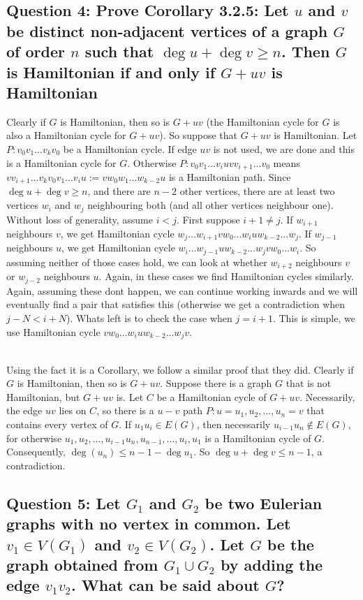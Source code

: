 \documentclass[letterpaper, 11pt]{article}
\newcommand{\1}{\mathds{1}}	%
\theoremstyle{definition}
\begin{document}
\subsection*{Question 4: Prove Corollary 3.2.5: Let $u$ and $v$ be distinct non-adjacent vertices of a graph $G$ of order $n$ such that $\deg u + \deg v \ge n$. Then $G$ is Hamiltonian if and only if $G + uv$ is Hamiltonian}
Clearly if $G$ is Hamiltonian, then so is $G + uv$ (the Hamiltonian cycle for $G$ is also a Hamiltonian cycle for $G + uv$). So suppose that $G + uv$ is Hamiltonian. Let $P: v_0v_1...v_kv_0$ be a Hamiltonian cycle. If edge $uv$ is not used, we are done and this is a Hamiltonian cycle for $G$. Otherwise $P : v_0v_1...v_{i}uvv_{i+1}...v_0$ means $vv_{i+1}...v_kv_0v_1...v_{i}u := vw_0w_1...w_{k-2}u$ is a Hamiltonian path. Since $\deg u + \deg v \ge n$, and there are $n-2$ other vertices, there are at least two vertices $w_i$ and $w_j$ neighbouring both (and all other vertices neighbour one). Without loss of generality, assume $i < j$. First suppose $i + 1 \ne j$. If $w_{i+1}$ neighbours $v$, we get Hamiltonian cycle $w_j ...w_{i+1}vw_0...w_iuw_{k-2}...w_j$. If $w_{j-1}$ neighbours $u$, we get Hamiltonian cycle $w_i ... w_{j-1}uw_{k-2}...w_j v w_0 ... w_i$. So assuming neither of those cases hold, we can look at whether $w_{i+2}$ neighbours $v$ or $w_{j-2}$ neighbours $u$. Again, in these cases we find Hamiltonian cycles similarly. Again, assuming these dont happen, we can continue working inwards and we will eventually find a pair that satisfies this (otherwise we get a contradiction when $j - N < i + N$). Whats left is to check the case when $j = i + 1$. This is simple, we use Hamiltonian cycle $vw_0...w_iuw_{k-2}...w_{j}v$.

 ~\\Using the fact it is a Corollary, we follow a similar proof that they did. 
Clearly if $G$ is Hamiltonian, then so is $G + uv$. Suppose there is a graph $G$ that is not Hamiltonian, but $G + uv$ is. Let $C$ be a Hamiltonian cycle of $G+uv$. Necessarily, the edge $uv$ lies on $C$, so there is a $u-v$ path $P:u=u_1,u_2,...,u_n=v$ that contains every vertex of $G$. If $u_1u_i \in E(G)$, then necessarily $u_{i-1}u_n \notin E(G)$, for otherwise $u_1,u_2,...,u_{i-1}u_n,u_{n-1},...,u_i,u_1$ is a Hamiltonian cycle of $G$. Consequently, $\deg (u_n) \le n-1-\deg u_1$. So $\deg u + \deg v \le n-1$, a contradiction.

\subsection*{Question 5: Let $G_1$ and $G_2$ be two Eulerian graphs with no vertex in common. Let $v_1 \in V(G_1)$ and $v_2 \in V(G_2)$. Let $G$ be the graph obtained from $G_1 \cup G_2$ by adding the edge $v_1v_2$. What can be said about $G$?}
\end{document}
